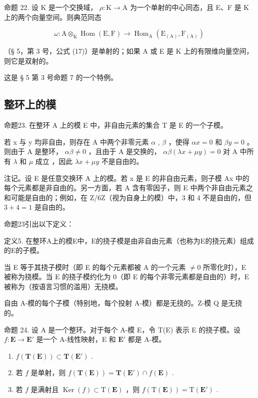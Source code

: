命题 22. 设 K 是一个交换域， \(\rho: \mathrm{K} \to \mathrm{A}\) 为一个单射的中心同态，且 E、F 是 K 上的两个向量空间。则典范同态

\[
\omega : \mathrm{A} \otimes_ {\mathrm{K}} \operatorname{Hom} (\mathrm{E}, \mathrm{F}) \rightarrow \operatorname{Hom} _ {\mathrm{A}} \left(\mathrm{E} _ {(\mathrm{A})}, \mathrm{F} _ {(\mathrm{A})}\right)\tag{36}
\]

（§ 5，第 3 号，公式 (17)）是单射的；如果 A 或 E 是 K 上的有限维向量空间，则它是双射的。

这是 § 5 第 3 号命题 7 的一个特例。

\subsection{整环上的模}

命题23. 在整环 A 上的模 E 中，非自由元素的集合 T 是 E 的一个子模。

若 x 与 y 均非自由，则存在 A 中两个非零元素 \(\alpha\) , \(\beta\) ，使得 \(\alpha x = 0\) 和 \(\beta y = 0\) 。则由于 A 是整环， \(\alpha\beta \neq 0\) ，且由于 A 是交换的， \(\alpha\beta(\lambda x + \mu y) = 0\) 对 A 中所有 \(\lambda\) 和 \(\mu\) 成立 ，因此 \(\lambda x + \mu y\) 不是自由的。

注记。设 E 是任意交换环 A 上的模。若 x 是 E 的非自由元素，则子模 Ax 中的每个元素都是非自由的。另一方面，若 A 含有零因子，则 E 中两个非自由元素之和可能是自由的；例如，在 Z/6Z（视为自身上的模）中，3 和 4 不是自由的，但 \(3 + 4 = 1\) 是自由的。

命题23引出以下定义：

定义5. 在整环A上的模E中，E的挠子模是由非自由元素（也称为E的挠元素）组成的E的子模。

当 E 等于其挠子模时（即 E 的每个元素都被 A 的一个元素 \(\neq0\) 所零化时），E 被称为挠模。当 E 的挠子模约化为 0（即 E 的每个非零元素都是自由的）时，E 被称为（按语言习惯的滥用）无挠模。

自由 A-模的每个子模（特别地，每个投射 A-模）都是无挠的。Z-模 Q 是无挠的。

命题 24. 设 A 是一个整环。对于每个 A-模 E，令 T(E) 表示 E 的挠子模。设 \(f: \mathbf{E} \to \mathbf{E}'\) 是一个 A-线性映射，E 和 \(\mathbf{E}'\) 都是 A-模。

\begin{enumerate}
\def\labelenumi{(\roman{enumi})}
\item
  \(f(\mathbf{T}(\mathbf{E})) \subset \mathbf{T}(\mathbf{E}')\) .
\item
  若 \(f\) 是单射，则 \(f(\mathbf{T}(\mathbf{E})) = \mathbf{T}(\mathbf{E}') \cap f(\mathbf{E})\) .
\item
  若 \(f\) 是满射且 \(\operatorname{Ker}(f) \subset \mathrm{T}(\mathbf{E})\) ，则 \(f(\mathrm{T}(\mathbf{E})) = \mathrm{T}(\mathbf{E}')\) .
\end{enumerate}


